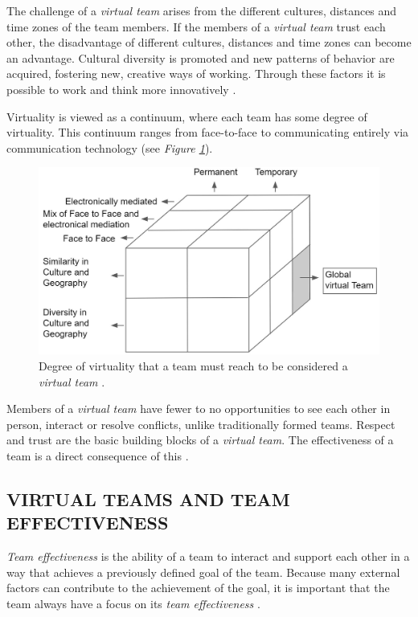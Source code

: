 \documentclass[sigchi]{acmart}
\begin{document}
The challenge of a \textit{virtual team} arises from the different cultures, distances and time zones of the team members. If the members of a \textit{virtual team} trust each other, the disadvantage of different cultures, distances and time zones can become an advantage. Cultural diversity is promoted and new patterns of behavior are acquired, fostering new, creative ways of working. Through these factors it is possible to work and think more innovatively \citep[p. 67-74]{dyer1995team} \citep{milliken1996searching}.

Virtuality is viewed as a continuum, where each team has some degree of virtuality. This continuum ranges from face-to-face to communicating entirely via communication technology \citep{martins2004virtual} (see \textit{Figure \ref{virtualTeamsVirtuality}}).

\begin{figure}[h]
  \centering
 	\includegraphics[width=\linewidth]{Abbildungen/Global-Virtual-Team.jpg}	
			\caption[Virtuality of a virtual team]{Degree of virtuality that a team must reach to be considered a \textit{virtual team} \citep{jarvenpaa1999communication}.}
			\label{virtualTeamsVirtuality}
\end{figure}

Members of a \textit{virtual team} have fewer to no opportunities to see each other in person, interact or resolve conflicts, unlike traditionally formed teams. Respect and trust are the basic building blocks of a \textit{virtual team}. The effectiveness of a team is a direct consequence of this \citep{ren2007applying}.

\subsection{VIRTUAL TEAMS AND TEAM EFFECTIVENESS}
\textit{Team effectiveness} is the ability of a team to interact and support each other in a way that achieves a previously defined goal of the team. Because many external factors can contribute to the achievement of the goal, it is important that the team always have a focus on its \textit{team effectiveness} \citep{salas2005there}.
\end{document}
